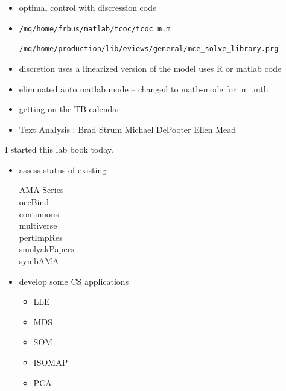 \documentclass[hyperref]{labbook}
\begin{document}
\begin{itemize}
\item optimal control with discression code 
\item \verb!/mq/home/frbus/matlab/tcoc/tcoc_m.m!

\verb!/mq/home/production/lib/eviews/general/mce_solve_library.prg!
\item discretion uses a linearized version of the model  uses R or matlab code
\end{itemize}





\begin{itemize}
\item eliminated auto matlab mode -- changed to math-mode for .m .mth
\item getting on the TB calendar
\end{itemize}

\begin{itemize}
\item Text Analysis : Brad Strum Michael DePooter Ellen Mead
\end{itemize}




I started this lab book today.




\begin{itemize}
\item assess status of existing
  \begin{description}
  \item[AMA Series]
\item[occBind]
\item[continuous]
\item[multiverse]
\item[pertImpRes]
\item[smolyakPapers]
\item[symbAMA]
  \end{description}

\item develop some CS applications
  \begin{itemize}
  \item LLE
  \item MDS
  \item SOM
  \item ISOMAP
  \item PCA
  \end{itemize}

\end{itemize}
\end{document}

